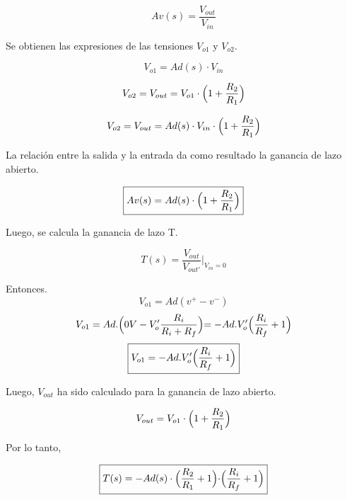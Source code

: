 \begin{equation}
    Av(s) = \frac{V_{out}}{V_{in}}
\end{equation}

\bigskip
\hspace{1mm} Se obtienen las expresiones de las tensiones \(V_{o1}\) y \(V_{o2}\).

\begin{equation}
    V_{o1} = Ad(s)\cdot V_{in} 
\end{equation}

\begin{equation}
     V_{o2} =V_{out}= V_{o1}\cdot \Bigl(1+\frac{R_2}{R_1}\Bigl)
\end{equation}

\begin{equation}
    V_{o2} =V_{out}= Ad(s) \cdot V_{in} \cdot \Bigl(1+\frac{R_2}{R_1}\Bigl)
\end{equation}

\hspace{1mm} La relación entre la salida y la entrada da como resultado la ganancia de lazo abierto.

\begin{equation}
    \boxed{
    Av(s) = Ad(s)\cdot \Bigl(1+\frac{R_2}{R_1}\Bigl)
    }
\end{equation}

\bigskip
\hspace{1mm} Luego, se calcula la ganancia de lazo T.

\bigskip
    \[T(s) = \frac{V_{out}}{V_{out'}}|_{V_{in}=0}\]

\hspace{1mm} Entonces.
\[V_{o1}= Ad(v^+-v^-)\]
\[V_{o1}= Ad.\Bigl(0V-V_{o}'\frac{R_i}{R_i+R_f}\Bigl)=-Ad.V_{o}'\Bigl(\frac{R_i}{R_f}+1\Bigl)\]
\begin{equation}\label{eq:primera_etapa} 
\boxed{V_{o1} = -Ad.V_{o}'\Bigl(\frac{R_i}{R_f}+1\Bigl)}
\end{equation}

\bigskip
\hspace{1mm} Luego, \(V_{out}\)  ha sido calculado para la ganancia de lazo abierto.

\begin{equation}
    V_{out}= V_{o1}\cdot \Bigl(1+\frac{R_2}{R_1}\Bigl)
\end{equation}

\hspace{1mm} Por lo tanto, 

\begin{equation}
    \boxed{
      T(s) = -Ad(s)\cdot \Bigl(\frac{R_2}{R_1}+1\Bigl)\cdot \Bigl(\frac{R_i}{R_f}+1\Bigl)
    }
\end{equation}
  
